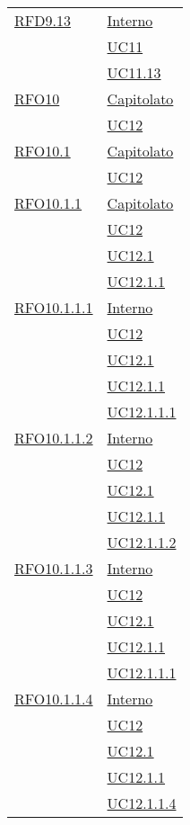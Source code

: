 \begin{longtable}{|>{\centering}m{5cm}|m{5cm}<{\centering}|}
  \hyperlink{RFD9.13}{RFD9.13} 
  & \hyperlink{Interno}{Interno}\\
& \hyperref[UC11]{UC11}\\
& \hyperref[UC11.13]{UC11.13}\\\hline

  \hyperlink{RFO10}{RFO10} 
  & \hyperlink{Capitolato}{Capitolato}\\
& \hyperref[UC12]{UC12}\\\hline

 \hyperlink{RFO10.1}{RFO10.1} 
  & \hyperlink{Capitolato}{Capitolato}\\
& \hyperref[UC12]{UC12}\\\hline

 \hyperlink{RFO10.1.1}{RFO10.1.1} 
  & \hyperlink{Capitolato}{Capitolato}\\
& \hyperref[UC12]{UC12}\\
& \hyperref[UC12.1]{UC12.1}\\
& \hyperref[UC12.1.1]{UC12.1.1}\\\hline

 \hyperlink{RFO10.1.1.1}{RFO10.1.1.1} 
 & \hyperlink{Interno}{Interno}\\
& \hyperref[UC12]{UC12}\\
& \hyperref[UC12.1]{UC12.1}\\
& \hyperref[UC12.1.1]{UC12.1.1}\\
& \hyperref[UC12.1.1.1]{UC12.1.1.1}\\\hline

 \hyperlink{RFO10.1.1.2}{RFO10.1.1.2} 
 & \hyperlink{Interno}{Interno}\\
& \hyperref[UC12]{UC12}\\
& \hyperref[UC12.1]{UC12.1}\\
& \hyperref[UC12.1.1]{UC12.1.1}\\
& \hyperref[UC12.1.1.2]{UC12.1.1.2}\\\hline

 \hyperlink{RFO10.1.1.3}{RFO10.1.1.3} 
 & \hyperlink{Interno}{Interno}\\
& \hyperref[UC12]{UC12}\\
& \hyperref[UC12.1]{UC12.1}\\
& \hyperref[UC12.1.1]{UC12.1.1}\\
& \hyperref[UC12.1.1.1]{UC12.1.1.1}\\\hline

 \hyperlink{RFO10.1.1.4}{RFO10.1.1.4} 
 & \hyperlink{Interno}{Interno}\\
& \hyperref[UC12]{UC12}\\
& \hyperref[UC12.1]{UC12.1}\\
& \hyperref[UC12.1.1]{UC12.1.1}\\
& \hyperref[UC12.1.1.4]{UC12.1.1.4}\\\hline


\end{longtable}
